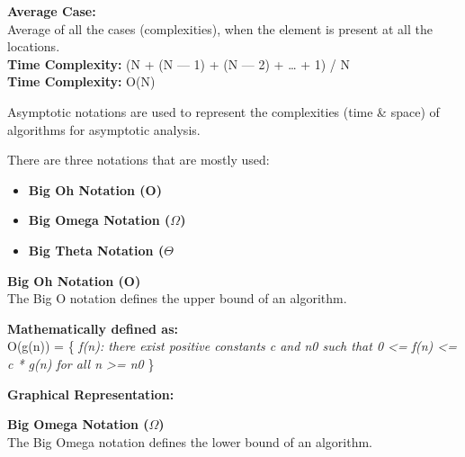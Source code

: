 \textbf{Average Case:}\\
Average of all the cases (complexities), when the element is present at
all the locations.\\
\textbf{Time Complexity:} (N + (N --- 1) + (N --- 2) + \ldots{} + 1) /
N\\
\textbf{Time Complexity:} O(N)

{}{}{}

\hypertarget{89d0}{\label{89d0}}

\hypertarget{5c13}{\label{5c13}}

Asymptotic notations are used to represent the complexities (time \&
space) of algorithms for asymptotic analysis.

There are three notations that are mostly used:

\begin{itemize}
	\tightlist
	\item
	      \textbf{Big Oh Notation (O)}
	\item
	      \textbf{Big Omega Notation ($\Omega$)}
	\item
	      \textbf{Big Theta Notation ($\Theta$}
\end{itemize}

\hypertarget{731a}{\label{731a}}

\textbf{Big Oh Notation (O)}\\
The Big O notation defines the upper bound of an algorithm.

\textbf{Mathematically defined as:}\\
O(g(n)) = \{ \emph{f(n): there exist positive constants c and n0 such
	that 0 \textless= f(n) \textless= c * g(n) for all n \textgreater= n0}
\}

\textbf{Graphical Representation:}


\hypertarget{745a}{\label{745a}}

\textbf{Big Omega Notation ($\Omega$)}\\
The Big Omega notation defines the lower bound of an algorithm.

